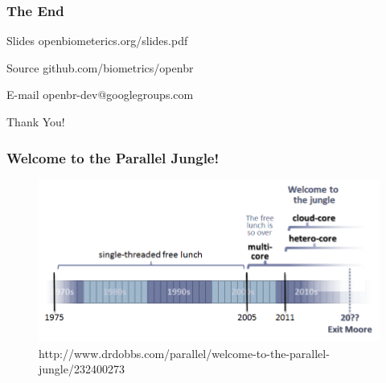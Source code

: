 \documentclass[12pt]{beamer}
\begin{document}
\begin{frame}
\frametitle{The End}
\begin{block}{Slides}
\centering
openbiometerics.org/slides.pdf
\end{block}
\begin{block}{Source}
\centering
github.com/biometrics/openbr
\end{block}
\begin{block}{E-mail}
\centering
openbr-dev@googlegroups.com
\end{block}
\begin{center}
Thank You!
\end{center}
\end{frame}

\begin{frame}
\frametitle{Welcome to the Parallel Jungle!}
\begin{figure}
\includegraphics[width=\textwidth]{img/sutter}
\caption{http://www.drdobbs.com/parallel/welcome-to-the-parallel-jungle/232400273}
\end{figure}
\end{frame}
\end{document}

